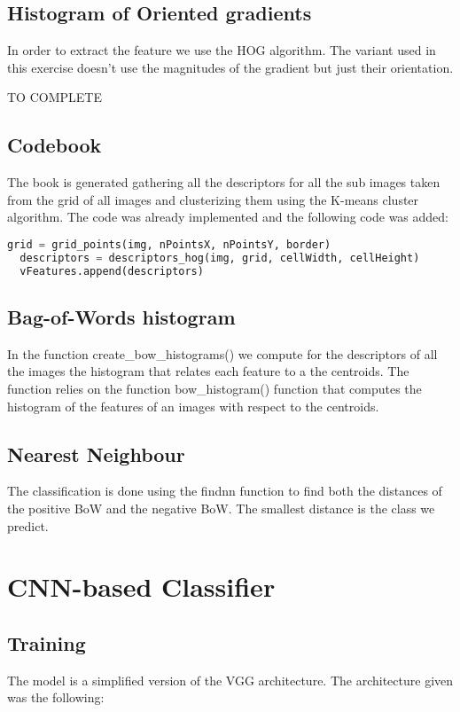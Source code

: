 \documentclass{ETHExercise}
\begin{document}
\subsection{Histogram of Oriented gradients}
In order to extract the feature we use the HOG algorithm. The variant
used in this exercise doesn't use the magnitudes of the gradient but just
their orientation.

TO COMPLETE
\subsection{Codebook}
The book is generated gathering all the descriptors for all the sub images 
taken from the grid of all images and clusterizing them using the K-means cluster
algorithm. The code was already implemented and the following code
was added:
\begin{lstlisting}[language=Python, caption=Codebook Generation]
  grid = grid_points(img, nPointsX, nPointsY, border)
  descriptors = descriptors_hog(img, grid, cellWidth, cellHeight)
  vFeatures.append(descriptors)
\end{lstlisting}

\subsection{Bag-of-Words histogram}
In the function create\_bow\_histograms() we compute for the descriptors of all the images 
the histogram that relates each feature to a the centroids. The function
relies on the function bow\_histogram() function that computes the histogram of the features of an images
with respect to the centroids.

\subsection{Nearest Neighbour}

The classification is done using the findnn function to find both the 
distances of the positive BoW and the negative BoW. The smallest distance
is the class we predict.

\section{CNN-based Classifier}

\subsection{Training}
The model is a simplified version of the VGG architecture. The architecture given was
the following:
\end{document}
